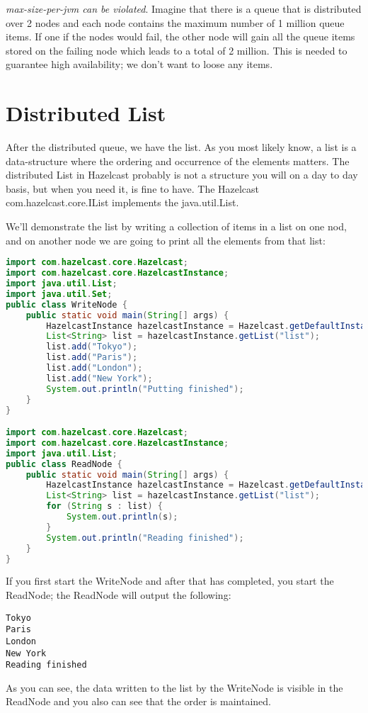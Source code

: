 \emph{max-size-per-jvm can be violated}. Imagine that there is a queue that is distributed over 2 nodes and each node contains the maximum number of 1 million queue items. If one if the nodes would fail, the other node will gain all the queue items stored on the failing node which leads to a total of 2 million. This is needed to guarantee high availability; we don't want to loose any items. 

\section{Distributed List}

After the distributed queue, we have the list. As you most likely know, a list is a data-structure where the ordering and occurrence of the elements matters. The distributed List in Hazelcast probably is not a structure you will on a day to day basis, but when you need it, is fine to have. The Hazelcast com.hazelcast.core.IList implements the java.util.List.

We'll demonstrate the list by writing a collection of items in a list on one nod, and on another node we are going to print all the elements from that list:

\begin{lstlisting}[language=java]
import com.hazelcast.core.Hazelcast;
import com.hazelcast.core.HazelcastInstance;
import java.util.List;
import java.util.Set;
public class WriteNode {
    public static void main(String[] args) {
        HazelcastInstance hazelcastInstance = Hazelcast.getDefaultInstance();
        List<String> list = hazelcastInstance.getList("list");
        list.add("Tokyo");
        list.add("Paris");
        list.add("London");
        list.add("New York");
        System.out.println("Putting finished");
    }
}

import com.hazelcast.core.Hazelcast;
import com.hazelcast.core.HazelcastInstance;
import java.util.List;
public class ReadNode {
    public static void main(String[] args) {
        HazelcastInstance hazelcastInstance = Hazelcast.getDefaultInstance();
        List<String> list = hazelcastInstance.getList("list");
        for (String s : list) {
            System.out.println(s);
        }
        System.out.println("Reading finished");
    }
}
\end{lstlisting}

If you first start the WriteNode and after that has completed, you start the ReadNode; the ReadNode will output the following:
\begin{verbatim}
Tokyo
Paris
London
New York
Reading finished
\end{verbatim}
As you can see, the data written to the list by the WriteNode is visible in the ReadNode and you also can see that the order is maintained.


